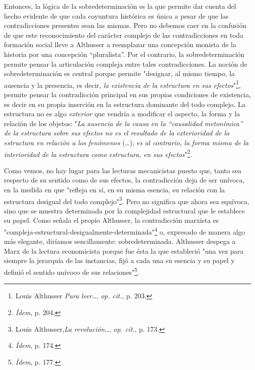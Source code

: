 Entonces, la lógica de la sobredeterminación es la que permite dar
cuenta del hecho evidente de que cada coyuntura histórica es única a
pesar de que las contradicciones presentes sean las mismas. Pero no
debemos caer en la confusión de que este reconocimiento del carácter
complejo de las contradicciones en toda formación social lleve a
Althusser a reemplazar una concepción monista de la historia por una
concepción ``pluralista''. Por el contrario, la sobredeterminación
permite pensar la articulación compleja entre tales contradicciones. La
noción de sobredeterminación es central porque permite "designar, al
mismo tiempo, la ausencia y la presencia, es decir, \emph{la existencia
de la estructura en sus efectos}"\footnote{Louis Althusser \emph{Para
  leer}\ldots, \emph{op. cit.}, p. 203.}, permite pensar la
contradicción principal en sus propias condiciones de existencia, es
decir en su propia inserción en la estructura dominante del todo
complejo. La estructura no es algo \emph{exterior} que vendría a
modificar el aspecto, la forma y la relación de los objetos: "\emph{La
ausencia de la causa en la ``causalidad metonímica'' de la estructura
sobre sus efectos no es el resultado de la exterioridad de la estructura
en relación a los fenómenos} (\dots); \emph{es al contrario, la
forma misma de la interioridad de la estructura como estructura, en sus
efectos}"\footnote{\emph{Ídem}, p. 204.}.

Como vemos, no hay lugar para las lecturas mecanicistas puesto que,
tanto sea respecto de su sentido como de sus efectos, la contradicción
deja de ser unívoca, en la medida en que "refleja en sí, en su misma
esencia, su relación con la estructura desigual del todo
complejo"\footnote{Louis Althusser,\emph{La revolución}\ldots, \emph{op.
  cit.}, p. 173.}. Pero no significa que ahora sea equívoca, sino que se
muestra determinada por la complejidad estructural que le establece su
papel. Como señala el propio Althusser, la contradicción marxista es
"compleja-estructural-desigualmente-determinada"\footnote{\emph{Ídem},
  p. 174.} o, expresado de manera algo más elegante, diríamos
sencillamente: sobredeterminada. Althusser despega a Marx de la lectura
economicista porque fue ésta la que estableció "una vez para siempre la
jerarquía de las instancias, fijó a cada una su esencia y su papel y
definió el sentido unívoco de sus relaciones"\footnote{\emph{Ídem}, p.
  177.}.

